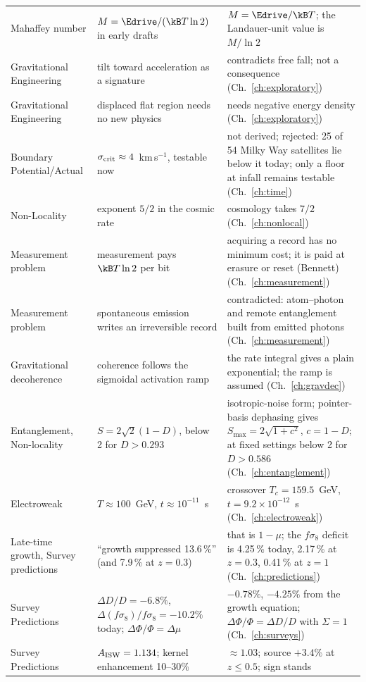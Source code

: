 {\begin{longtable}{@{}p{}p{}p{}@{}}
Mahaffey number & $M=\Edrive/(\kB T\ln2)$ in early drafts & $M=\Edrive/\kB T$; the Landauer-unit value is $M/\ln2$ \\
Gravitational Engineering & tilt toward acceleration as a signature & contradicts free fall; not a consequence (Ch.~\ref{ch:exploratory}) \\
Gravitational Engineering & displaced flat region needs no new physics & needs negative energy density (Ch.~\ref{ch:exploratory}) \\
Boundary Potential/Actual & $\sigma_{\rm crit}\approx4$~km\,s$^{-1}$, testable now & not derived; rejected: 25 of 54 Milky Way satellites lie below it today; only a floor at infall remains testable (Ch.~\ref{ch:time}) \\
Non-Locality & exponent $5/2$ in the cosmic rate & cosmology takes $7/2$ (Ch.~\ref{ch:nonlocal}) \\
Measurement problem & measurement pays $\kB T\ln2$ per bit & acquiring a record has no minimum cost; it is paid at erasure or reset (Bennett) (Ch.~\ref{ch:measurement}) \\
Measurement problem & spontaneous emission writes an irreversible record & contradicted: atom--photon and remote entanglement built from emitted photons (Ch.~\ref{ch:measurement}) \\
Gravitational decoherence & coherence follows the sigmoidal activation ramp & the rate integral gives a plain exponential; the ramp is assumed (Ch.~\ref{ch:gravdec}) \\
Entanglement, Non-locality & $S=2\sqrt2(1-D)$, below 2 for $D>0.293$ & isotropic-noise form; pointer-basis dephasing gives $S_{\max}=2\sqrt{1+c^2}$, $c=1-D$; at fixed settings below 2 for $D>0.586$ (Ch.~\ref{ch:entanglement}) \\
Electroweak & $T\approx100$~GeV, $t\approx10^{-11}$~s & crossover $T_c=159.5$~GeV, $t=9.2\times10^{-12}$~s (Ch.~\ref{ch:electroweak}) \\
Late-time growth, Survey predictions & ``growth suppressed 13.6\,\%'' (and 7.9\,\% at $z=0.3$) & that is $1-\mu$; the $f\sigma_8$ deficit is 4.25\,\% today, 2.17\,\% at $z=0.3$, 0.41\,\% at $z=1$ (Ch.~\ref{ch:predictions}) \\
Survey Predictions & $\Delta D/D=-6.8\%$, $\Delta(f\sigma_8)/f\sigma_8=-10.2\%$ today; $\Delta\Phi/\Phi=\Delta\mu$ & $-0.78\%$, $-4.25\%$ from the growth equation; $\Delta\Phi/\Phi=\Delta D/D$ with $\Sigma=1$ (Ch.~\ref{ch:surveys}) \\
Survey Predictions & $A_{\rm ISW}=1.134$; kernel enhancement 10--30\% & $\approx1.03$; source $+3.4\%$ at $z\le0.5$; sign stands \\

\end{longtable}}
